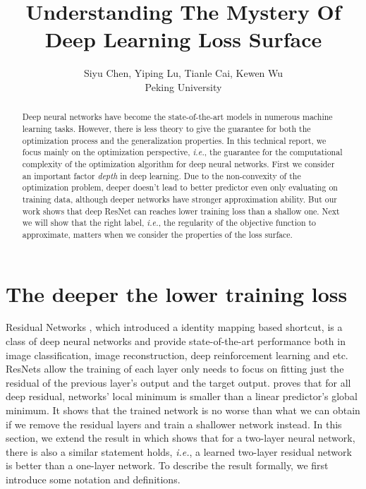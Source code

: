 \documentclass{article}
\title{Understanding The Mystery Of Deep Learning Loss Surface}
\author{
	Siyu Chen, Yiping Lu, Tianle Cai, Kewen Wu\\
Peking University
}
\theoremstyle{plain}
\theoremstyle{definition}
\begin{document}

\maketitle

\begin{abstract}
Deep neural networks have become the state-of-the-art
models in numerous machine learning
tasks. However, there is less theory to give the guarantee for both the optimization process and the generalization properties. In this technical report, we focus mainly on the optimization perspective, \emph{i.e.}, the guarantee for the computational complexity of the optimization algorithm for deep neural networks. First we consider an important factor \emph{depth} in deep learning. Due to the non-convexity of the optimization problem, deeper doesn't lead to better predictor even only evaluating on training data, although deeper networks have stronger approximation ability. But our work shows that deep ResNet can reaches lower training loss than a shallow one. Next we will show that the right label, \emph{i.e.}, the regularity of the objective function to approximate, matters when we consider the properties of the loss surface.

\end{abstract}

\section{The deeper the lower training loss}

Residual Networks \cite{he2016deep,he2016identity}, which introduced a identity mapping based shortcut, is a class of deep neural networks and provide state-of-the-art performance both in image classification\cite{he2016deep,he2016identity}, image reconstruction\cite{he2016deep}, deep reinforcement learning\cite{silver2017mastering} and etc. ResNets allow the training of each layer only needs to focus on fitting just the residual of the previous layer’s output and the target output. \cite{2018arXiv180406739S} proves that for all deep residual, networks' local minimum is smaller than a linear predictor's global minimum. It shows that the trained network is no worse than what we can obtain if we remove the
residual layers and train a shallower network instead. In this section, we extend the result in \cite{2018arXiv180406739S} which shows that for a two-layer neural network, there is also a similar statement holds, \emph{i.e.}, a learned two-layer residual network is better than a one-layer network. To describe the result formally, we first introduce some notation and definitions.
\end{document}
